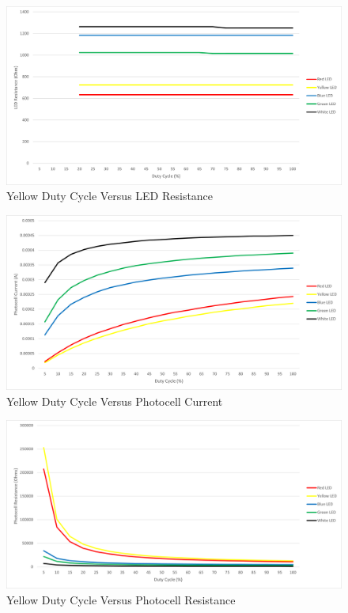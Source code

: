 \documentclass[12pt,titlepage]{article}
\begin{document}
\begin{figure}[!htb]
  \centering
  \includegraphics[width=5in]{lab_4/duty_cycle_led_res.png}
  \caption{Yellow Duty Cycle Versus LED Resistance}
\end{figure}
\begin{figure}[!htb]
  \centering
  \includegraphics[width=5in]{lab_4/duty_cycle_photo_curr.png}
  \caption{Yellow Duty Cycle Versus Photocell Current}
\end{figure}
\begin{figure}[!htb]
\centering
\includegraphics[width=5in]{lab_4/duty_cycle_photo_res.png}
\caption{Yellow Duty Cycle Versus Photocell Resistance}
\end{figure}
\end{document}
